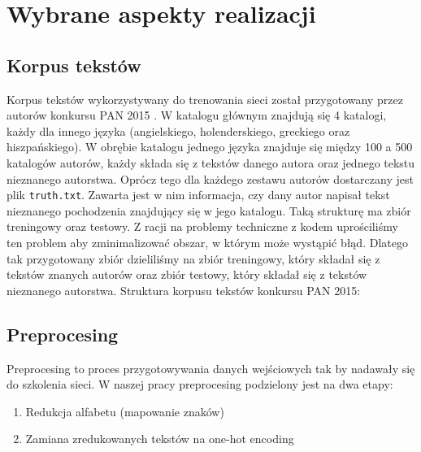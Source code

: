 \newpage
\section{Wybrane aspekty realizacji}

\subsection{Korpus tekstów}
Korpus tekstów wykorzystywany do trenowania sieci został przygotowany przez autorów konkursu PAN 2015 \cite{pan}.
W katalogu głównym znajdują się 4 katalogi, każdy dla innego języka (angielskiego, holenderskiego, greckiego oraz hiszpańskiego).
W obrębie katalogu jednego języka znajduje się między 100 a 500 katalogów autorów, każdy składa się z tekstów danego autora oraz jednego
tekstu nieznanego autorstwa. Oprócz tego dla każdego zestawu autorów dostarczany jest plik \texttt{truth.txt}.
Zawarta jest w nim informacja, czy dany autor napisał tekst nieznanego pochodzenia znajdujący się w jego katalogu.
Taką strukturę ma zbiór treningowy oraz testowy. Z racji na problemy techniczne z kodem uprościliśmy ten problem 
aby zminimalizować obszar, w którym może wystąpić błąd. Dlatego tak przygotowany zbiór dzieliliśmy na zbiór treningowy, który
składał się z tekstów znanych autorów oraz zbiór testowy, który składał się z tekstów nieznanego autorstwa. 
\newline Struktura korpusu tekstów konkursu PAN 2015:

\myspace
{}
\myspace

\subsection{Preprocesing}
Preprocesing to proces przygotowywania danych wejściowych tak by nadawały się do szkolenia sieci.
W naszej pracy preprocesing podzielony jest na dwa etapy:
\begin{enumerate}
	\item Redukcja alfabetu (mapowanie znaków)
	\item Zamiana zredukowanych tekstów na one-hot encoding
\end{enumerate}

